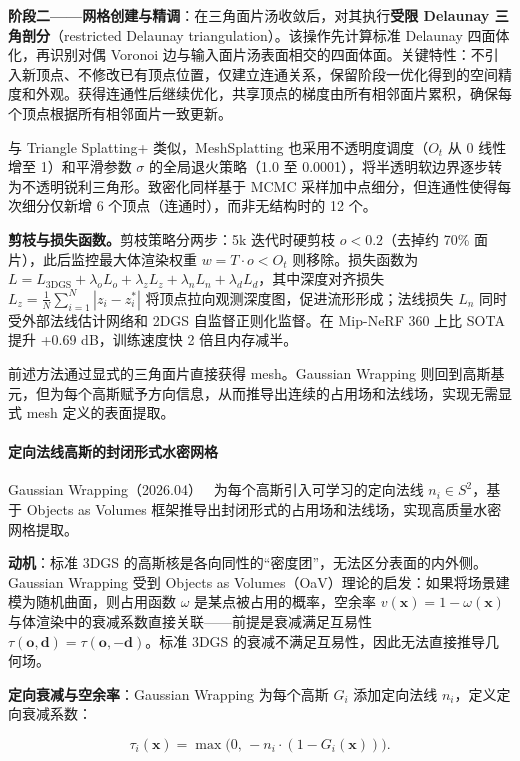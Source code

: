 \textbf{阶段二——网格创建与精调}：在三角面片汤收敛后，对其执行\textbf{受限 Delaunay 三角剖分}（restricted Delaunay triangulation）。该操作先计算标准 Delaunay 四面体化，再识别对偶 Voronoi 边与输入面片汤表面相交的四面体面。关键特性：不引入新顶点、不修改已有顶点位置，仅建立连通关系，保留阶段一优化得到的空间精度和外观。获得连通性后继续优化，共享顶点的梯度由所有相邻面片累积，确保每个顶点根据所有相邻面片一致更新。

与 Triangle Splatting+ 类似，MeshSplatting 也采用不透明度调度（$O_t$ 从 0 线性增至 1）和平滑参数 $\sigma$ 的全局退火策略（1.0 至 0.0001），将半透明软边界逐步转为不透明锐利三角形。致密化同样基于 MCMC 采样加中点细分，但连通性使得每次细分仅新增 6 个顶点（连通时），而非无结构时的 12 个。

\textbf{剪枝与损失函数。}剪枝策略分两步：5k 迭代时硬剪枝 $o < 0.2$（去掉约 70\% 面片），此后监控最大体渲染权重 $w = T \cdot o < O_t$ 则移除。损失函数为 $L = L_{\text{3DGS}} + \lambda_o L_o + \lambda_z L_z + \lambda_n L_n + \lambda_d L_d$，其中深度对齐损失 $L_z = \frac{1}{N}\sum_{i=1}^{N}|z_i - z_i^*|$ 将顶点拉向观测深度图，促进流形形成；法线损失 $L_n$ 同时受外部法线估计网络和 2DGS 自监督正则化监督。在 Mip-NeRF 360 上比 SOTA 提升 +0.69 dB，训练速度快 2 倍且内存减半。

前述方法通过显式的三角面片直接获得 mesh。Gaussian Wrapping 则回到高斯基元，但为每个高斯赋予方向信息，从而推导出连续的占用场和法线场，实现无需显式 mesh 定义的表面提取。

\paragraph{定向法线高斯的封闭形式水密网格}

Gaussian Wrapping（2026.04）~\cite{2604_07337} 为每个高斯引入可学习的定向法线 $n_i \in S^2$，基于 Objects as Volumes 框架推导出封闭形式的占用场和法线场，实现高质量水密网格提取。

\textbf{动机}：标准 3DGS 的高斯核是各向同性的“密度团”，无法区分表面的内外侧。Gaussian Wrapping 受到 Objects as Volumes（OaV）理论的启发：如果将场景建模为随机曲面，则占用函数 $\omega$ 是某点被占用的概率，空余率 $v(\mathbf{x}) = 1 - \omega(\mathbf{x})$ 与体渲染中的衰减系数直接关联——前提是衰减满足互易性 $\tau(\mathbf{o}, \mathbf{d}) = \tau(\mathbf{o}, -\mathbf{d})$。标准 3DGS 的衰减不满足互易性，因此无法直接推导几何场。

\textbf{定向衰减与空余率}：Gaussian Wrapping 为每个高斯 $G_i$ 添加定向法线 $n_i$，定义定向衰减系数：

\begin{equation*}
\tau_i(\mathbf{x}) = \max\big(0,\, -n_i \cdot (1 - G_i(\mathbf{x}))\big).
\end{equation*}

